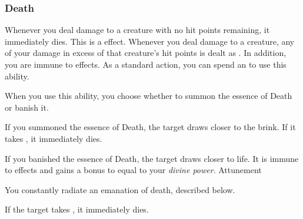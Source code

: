         \subsubsection{Death}
             Whenever you deal damage to a creature with no hit points remaining, it immediately dies.
            This is a  effect.
             Whenever you deal damage to a creature, any of your damage in excess of that creature's hit points is dealt as .
            In addition, you are immune to  effects.
             As a standard action, you can spend an  to use this ability.
            \begin{ability}
                \begin{spelltargetinginfo}
                    \spellspecial When you use this ability, you choose whether to summon the essence of Death or banish it.
                \end{spelltargetinginfo}
                \begin{spelleffects}
                    \spelleffect If you summoned the essence of Death, the target draws closer to the brink.
                    If it takes , it immediately dies.

                    If you banished the essence of Death, the target draws closer to life.
                    It is immune to  effects and gains a bonus to  equal to your \textit{divine power}.
                    \spelldur Attunement
                \end{spelleffects}
            \end{ability}
             You constantly radiate an emanation of death, described below.
            \begin{ability}
                \begin{spelltargetinginfo}
                \end{spelltargetinginfo}
                \begin{spelleffects}
                    \spelleffect If the target takes , it immediately dies.
                \end{spelleffects}
            \end{ability}

